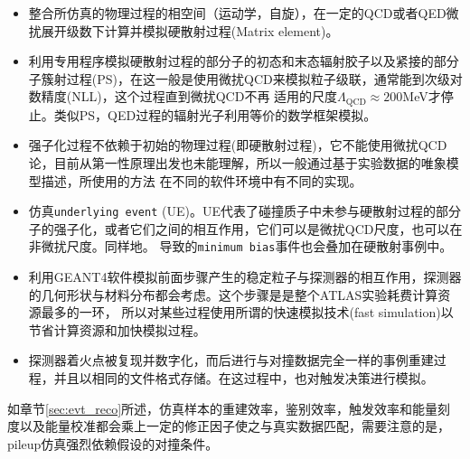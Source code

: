 \begin{itemize}
  \item 整合所仿真的物理过程的相空间（运动学，自旋），在一定的QCD或者QED微扰展开级数下计算并模拟硬散射过程(Matrix element)。
  \item 利用专用程序模拟硬散射过程的部分子的初态和末态辐射胶子以及紧接的部分子簇射过程(PS)，在这一般是使用微扰QCD来模拟粒子级联，通常能到次级对数精度(NLL)，这个过程直到微扰QCD不再
  适用的尺度$\Lambda_{\text{QCD}}\approx200$MeV才停止。类似PS，QED过程的辐射光子利用等价的数学框架模拟。
  \item 强子化过程不依赖于初始的物理过程(即硬散射过程)，它不能使用微扰QCD论，目前从第一性原理出发也未能理解，所以一般通过基于实验数据的唯象模型描述，所使用的方法
      在不同的软件环境中有不同的实现。
   \item 仿真\texttt{underlying event} (UE)。UE代表了碰撞质子中未参与硬散射过程的部分子的强子化，或者它们之间的相互作用，它们可以是微扰QCD尺度，也可以在非微扰尺度。同样地。
   导致\pileup 的\texttt{minimum bias}事件也会叠加在硬散射事例中。
   \item 利用GEANT4软件\cite{AGOSTINELLI2003250}模拟前面步骤产生的稳定粒子与探测器的相互作用，探测器的几何形状与材料分布都会考虑\cite{Aad2010-atlas-simu}。这个步骤是是整个ATLAS实验耗费计算资源最多的一环，
     所以对某些过程使用所谓的快速模拟技术(fast simulation)\cite{Lukas:2012kua}以节省计算资源和加快模拟过程。
    \item 探测器着火点被复现并数字化，而后进行与对撞数据完全一样的事例重建过程，并且以相同的文件格式存储。在这过程中，也对触发决策进行模拟。
 \end{itemize}

 如章节\ref{sec:evt_reco}所述，仿真样本的重建效率，鉴别效率，触发效率和能量刻度以及能量校准都会乘上一定的修正因子使之与真实数据匹配，需要注意的是，pileup仿真强烈依赖假设的对撞条件。
